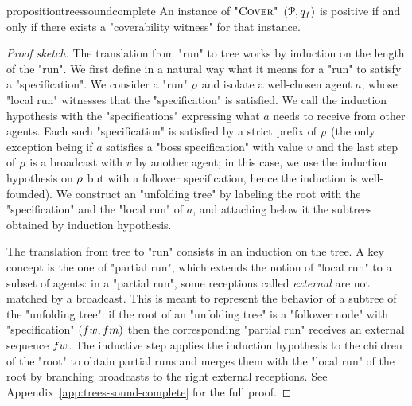 \begin{restatable}{proposition}{treessoundcomplete}
	\label{prop:trees-sound-complete}
	An instance of $\textsc{"Cover"}$ $(\mathcal{P},q_f)$ is positive if and only if there exists a "coverability witness" for that instance.
\end{restatable}
\begin{proof}[Proof sketch]
	The translation from "run" to tree works by induction on the length of the "run". We first define in a natural way what it means for a "run" to satisfy a "specification". We consider a "run" $\rho$ and isolate a well-chosen agent $a$, whose "local run" witnesses that the "specification" is satisfied. We call the induction hypothesis with the "specifications" expressing what $a$ needs to receive from other agents. Each such "specification" is satisfied by a strict prefix of $\rho$ (the only exception being if $a$ satisfies a "boss specification" with value $v$ and the last step of $\rho$ is a broadcast with $v$ by another agent; in this case, we use the induction hypothesis on $\rho$ but with a follower specification, hence the induction is well-founded).
	We construct an "unfolding tree" by labeling the root with the "specification" and the "local run" of $a$, and attaching below it the subtrees obtained by induction hypothesis.
	
	The translation from tree to "run" consists in an induction on the tree. A key concept is the one of "partial run", which extends the notion of "local run" to a subset of agents: in a "partial run", some receptions called \emph{external} are not matched by a broadcast. This is meant to represent the behavior of a subtree of the "unfolding tree": if the root of an "unfolding tree" is a "follower node" with "specification" $(\followwordspec, \followmessagespec)$ then the corresponding "partial run" receives an external sequence $\followwordspec$. The inductive step applies the induction hypothesis to the children of the "root" to obtain partial runs and merges them with the "local run" of the root by branching broadcasts to the right external receptions. 
	See Appendix~\ref{app:trees-sound-complete} for the full proof. 
\end{proof}








